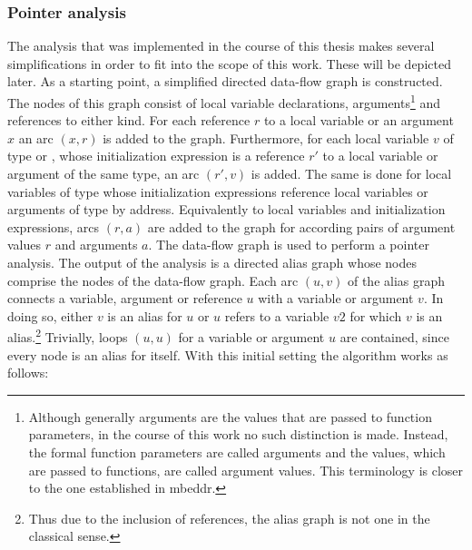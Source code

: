 \subsubsection*{Pointer analysis}
The analysis that was implemented in the course of this thesis makes several simplifications in order to fit into the scope of this work. 
These will be depicted later.
As a starting point, a simplified directed data-flow graph is constructed. The nodes of this graph consist of local variable declarations, arguments\footnote{Although generally arguments are the values that are passed to function parameters, in the course of this work no such distinction is made. Instead, the formal function parameters are called arguments and the values, which are passed to functions, are called argument values. This terminology is closer to the one established in mbeddr.} and references to either kind. For each reference $r$ to a local variable or an argument $x$ an arc $(x, r)$ is added to the graph. Furthermore, for each local variable $v$ of type  or , whose initialization expression is a reference $r'$ to a local variable or argument of the same type, an arc $(r', v)$ is added. The same is done for local variables of type  whose initialization expressions reference local variables or arguments of type  by address. Equivalently to local variables and initialization expressions, arcs $(r, a)$ are added to the graph for according pairs of argument values $r$ and arguments $a$.
The data-flow graph is used to perform a pointer analysis. The output of the analysis is a directed alias graph whose nodes comprise the nodes of the data-flow graph. Each arc $(u, v)$ of the alias graph connects a variable, argument or reference $u$ with a variable or argument $v$. In doing so, either $v$ is an alias for $u$ or $u$ refers to a variable $v2$ for which $v$ is an alias.\footnote{Thus due to the inclusion of references, the alias graph is not one in the classical sense.} Trivially, loops $(u, u)$ for a variable or argument $u$ are contained, since every node is an alias for itself. With this initial setting the algorithm works as follows:
